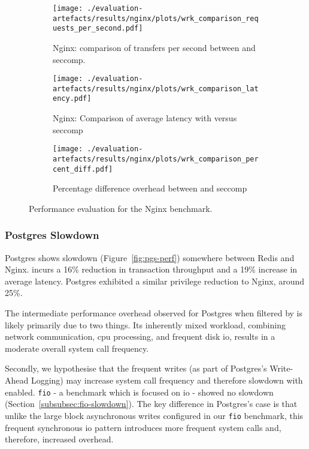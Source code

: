 \begin{figure}[htbp]
    \centering
    \begin{subfigure}[b]{0.75 \textwidth}
        \centering
        \texttt{[image: ./evaluation-artefacts/results/nginx/plots/wrk\_comparison\_requests\_per\_second.pdf]} 
        \caption{Nginx: comparison of transfers per second between \af and
        seccomp.}
        \label{fig:nginx-rps}
    \end{subfigure}
    \hfill
     \begin{subfigure}[b]{0.45 \textwidth}
        \centering
        \texttt{[image: ./evaluation-artefacts/results/nginx/plots/wrk\_comparison\_latency.pdf]} 
        \caption{Nginx: Comparison of average latency with \af versus
        seccomp}
        \label{fig:nginx-time}
    \end{subfigure}
     \medskip 
     \begin{subfigure}[b]{0.45 \textwidth}
        \centering
        \texttt{[image: ./evaluation-artefacts/results/nginx/plots/wrk\_comparison\_percent\_diff.pdf]} %
        \caption{Percentage difference overhead between \af and seccomp}
        \label{fig:nginx-percdiff}
    \end{subfigure}

    \caption{Performance evaluation for the Nginx benchmark.}
    \label{fig:nginx-perf}
\end{figure}

\subsubsection{Postgres Slowdown}\label{subsubsec:postgres-slowdown}

Postgres shows slowdown (Figure~\ref{fig:pgs-perf}) somewhere between Redis and Nginx. \af incurs a 16\% reduction in transaction throughput and
a 19\% increase in average latency. Postgres exhibited a similar privilege
reduction to Nginx, around 25\%. 

The intermediate performance overhead observed for Postgres when filtered
by \af is likely primarily due to two things. Its inherently mixed
workload, combining network communication, \ac{cpu} processing, and frequent
disk \ac{io}, results in a moderate overall system call frequency. 

Secondly, we hypothesise that the frequent writes (as part of Postgres's
Write-Ahead Logging) may increase system call frequency and therefore slowdown
with \af enabled. \texttt{fio} - a benchmark which is focused on \ac{io} -
showed no slowdown (Section~\ref{subsubsec:fio-slowdown}). The key difference in
Postgres's case is that unlike the large block asynchronous writes
configured in our \texttt{fio} benchmark, this frequent synchronous \ac{io}
pattern introduces more frequent system calls and, therefore, increased overhead.

